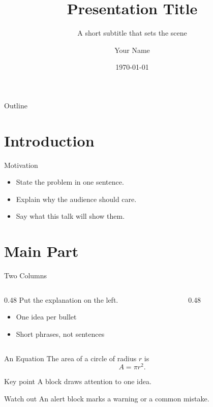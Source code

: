 \documentclass[aspectratio=169, 11pt]{beamer}
\title{Presentation Title}
\subtitle{A short subtitle that sets the scene}
\author{Your Name}
\institute{Your Organisation}
\date{\today}
\begin{document}
\begin{frame}
  \titlepage
\end{frame}

\begin{frame}{Outline}
  \tableofcontents
\end{frame}

\section{Introduction}

\begin{frame}{Motivation}
  \begin{itemize}
    \item State the problem in one sentence.
    \pause
    \item Explain why the audience should care.
    \pause
    \item Say what this talk will show them.
  \end{itemize}
\end{frame}

\section{Main Part}

\begin{frame}{Two Columns}
  \begin{columns}[T]
    \begin{column}{0.48\textwidth}
      Put the explanation on the left.
      \begin{itemize}
        \item One idea per bullet
        \item Short phrases, not sentences
      \end{itemize}
    \end{column}
    \begin{column}{0.48\textwidth}
      \centering
    \end{column}
  \end{columns}
\end{frame}

\begin{frame}{An Equation}
  The area of a circle of radius $r$ is
  \begin{equation}
    A = \pi r^2 .
  \end{equation}
  \begin{block}{Key point}
    A block draws attention to one idea.
  \end{block}
  \begin{alertblock}{Watch out}
    An alert block marks a warning or a common mistake.
  \end{alertblock}
\end{frame}
\end{document}
